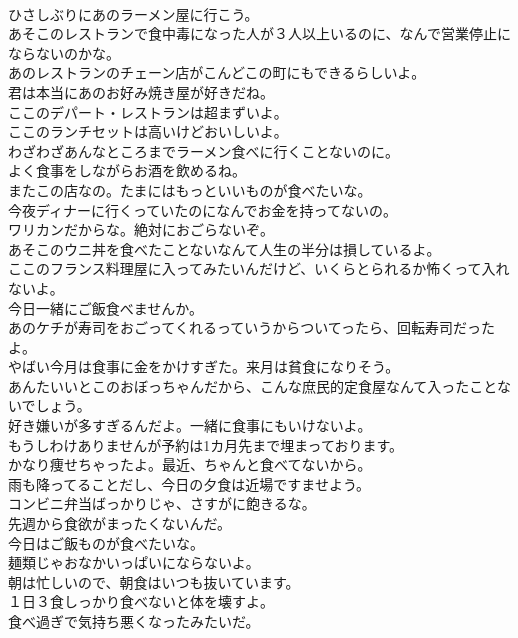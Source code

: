 \documentclass[8pt]{extreport}
\begin{document}
\begin{CJK}{UTF8}{min}
\\	ひさしぶりにあのラーメン屋に行こう。	
\\	あそこのレストランで食中毒になった人が３人以上いるのに、なんで営業停止にならないのかな。	
\\	あのレストランのチェーン店がこんどこの町にもできるらしいよ。	
\\	君は本当にあのお好み焼き屋が好きだね。	
\\	ここのデパート・レストランは超まずいよ。	
\\	ここのランチセットは高いけどおいしいよ。	
\\	わざわざあんなところまでラーメン食べに行くことないのに。	
\\	よく食事をしながらお酒を飲めるね。	
\\	またこの店なの。たまにはもっといいものが食べたいな。	
\\	今夜ディナーに行くっていたのになんでお金を持ってないの。	
\\	ワリカンだからな。絶対におごらないぞ。	
\\	あそこのウニ丼を食べたことないなんて人生の半分は損しているよ。	
\\	ここのフランス料理屋に入ってみたいんだけど、いくらとられるか怖くって入れないよ。	
\\	今日一緒にご飯食べませんか。	
\\	あのケチが寿司をおごってくれるっていうからついてったら、回転寿司だったよ。	
\\	やばい今月は食事に金をかけすぎた。来月は貧食になりそう。	
\\	あんたいいとこのおぼっちゃんだから、こんな庶民的定食屋なんて入ったことないでしょう。	
\\	好き嫌いが多すぎるんだよ。一緒に食事にもいけないよ。	
\\	もうしわけありませんが予約は1カ月先まで埋まっております。	
\\	かなり痩せちゃったよ。最近、ちゃんと食べてないから。	
\\	雨も降ってることだし、今日の夕食は近場ですませよう。	
\\	コンビニ弁当ばっかりじゃ、さすがに飽きるな。	
\\	先週から食欲がまったくないんだ。	
\\	今日はご飯ものが食べたいな。	
\\	麺類じゃおなかいっぱいにならないよ。	
\\	朝は忙しいので、朝食はいつも抜いています。	
\\	１日３食しっかり食べないと体を壊すよ。	
\\	食べ過ぎで気持ち悪くなったみたいだ。	

\end{CJK}
\end{document}
